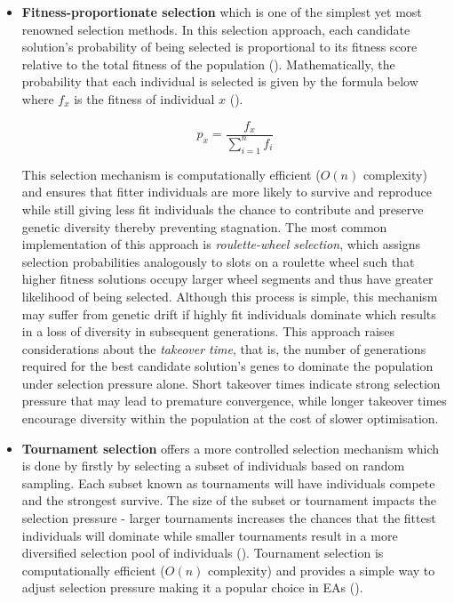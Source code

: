 \begin{itemize}
	\item \textbf{Fitness-proportionate selection} which is one of the simplest yet most renowned selection methods. In this selection approach, each candidate solution's probability of being selected is proportional to its fitness score relative to the total fitness of the population (\cite{shukla2015comparative}). Mathematically, the probability that each individual is selected is given by the formula below where $f_x$ is the fitness of individual $x$ (\cite{shukla2015comparative}).
	
	\begin{equation}
		p_x = \frac{f_x}{\sum^{n}_{i=1}f_i}
	\end{equation}

	This selection mechanism is computationally efficient ($O(n)$ complexity) and ensures that fitter individuals are more likely to survive and reproduce while still giving less fit individuals the chance to contribute and preserve genetic diversity thereby preventing stagnation. The most common implementation of this approach is \textit{roulette-wheel selection}, which assigns selection probabilities analogously to slots on a roulette wheel such that higher fitness solutions occupy larger wheel segments and thus have greater likelihood of being selected. Although this process is simple, this mechanism may suffer from genetic drift if highly fit individuals dominate which results in a loss of diversity in subsequent generations. This approach raises considerations about the \textit{takeover time}, that is, the number of generations required for the best candidate solution's genes to dominate the population under selection pressure alone. Short takeover times indicate strong selection pressure that may lead to premature convergence, while longer takeover times encourage diversity within the population at the cost of slower optimisation. \bigskip

	\item \textbf{Tournament selection} offers a more controlled selection mechanism which is done by firstly by selecting a subset of individuals based on random sampling. Each subset known as tournaments will have individuals compete and the strongest survive. The size of the subset or tournament impacts the selection pressure - larger tournaments increases the chances that the fittest individuals will dominate while smaller tournaments result in a more diversified selection pool of individuals (\cite{shukla2015comparative}). Tournament selection is computationally efficient ($O(n)$ complexity) and provides a simple way to adjust selection pressure making it a popular choice in EAs (\cite{shukla2015comparative}). \bigskip
	

\end{itemize}
